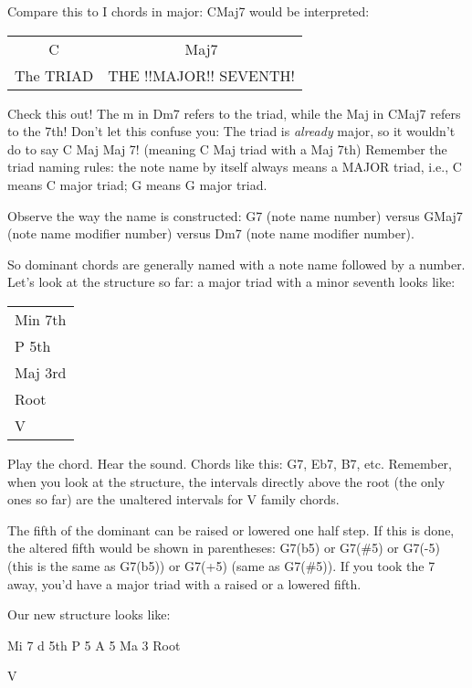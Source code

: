 Compare this to I chords in major: CMaj7 would be interpreted:

\begin{center}
\begin{tabular}{ c c }
  C           & Maj7\\
  The TRIAD   & THE !!MAJOR!! SEVENTH!\\
\end{tabular}
\end{center}

Check this out! The m in Dm7 refers to the triad, while the Maj in CMaj7
refers to the 7th! Don't let this confuse you: The triad is \emph{already} 
major, so it wouldn't do to say C Maj Maj 7! (meaning C Maj triad with
a Maj 7th) Remember the triad naming rules: the note name by itself always
means a MAJOR triad, i.e., C means C major triad; G means G major triad.

Observe the way the name is constructed: G7 (note name   number) versus
GMaj7 (note name  modifier  number) versus Dm7 (note name  modifier  number).

So dominant chords are generally named with a note name followed by a number.
Let's look at the structure so far: a major triad with a minor seventh looks
like:
\begin{center}
\begin{tabular}{ | l | }
  \hline
  Min 7th\\
  P 5th\\
  Maj 3rd\\
  Root\\
  \hline
  V\\
  \hline
\end{tabular}
\end{center}

Play the chord. Hear the sound. Chords like this: G7, Eb7, B7, etc. Remember,
when you look at the structure, the intervals directly above the root (the
only ones so far) are the unaltered intervals for V family chords.

The fifth of the dominant can be raised or lowered one half step. If this is
done, the altered fifth would be shown in parentheses: G7(b5) or G7(\#5) or
G7(-5) (this is the same as G7(b5)) or G7(+5) (same as G7(\#5)). If you took
the 7 away, you'd have a major triad with a raised or a lowered fifth.

Our new structure looks like:

        Mi 7
 d 5th   P 5   A 5
        Ma 3
        Root

         V

